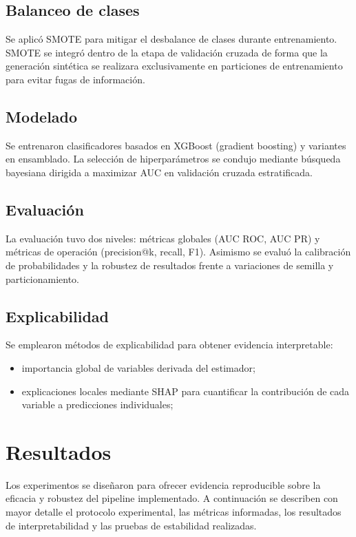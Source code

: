 \documentclass[12pt,a4paper]{article}
\begin{document}
\subsection{Balanceo de clases}
Se aplic\'o SMOTE para mitigar el desbalance de clases durante entrenamiento. SMOTE se integr\'o dentro de la etapa de validaci\'on cruzada de forma que la generaci\'on sint\'etica se realizara exclusivamente en particiones de entrenamiento para evitar fugas de informaci\'on.

\subsection{Modelado}
Se entrenaron clasificadores basados en XGBoost (gradient boosting) y variantes en ensamblado. La selecci\'on de hiperpar\'ametros se condujo mediante b\'usqueda bayesiana dirigida a maximizar AUC en validaci\'on cruzada estratificada.

\subsection{Evaluaci\'on}
La evaluaci\'on tuvo dos niveles: m\'etricas globales (AUC ROC, AUC PR) y m\'etricas de operaci\'on (precision@k, recall, F1). Asimismo se evalu\'o la calibraci\'on de probabilidades y la robustez de resultados frente a variaciones de semilla y particionamiento.

\subsection{Explicabilidad}
Se emplearon m\'etodos de explicabilidad para obtener evidencia interpretable:
\begin{itemize}[leftmargin=*]
  \item importancia global de variables derivada del estimador;
  \item explicaciones locales mediante SHAP para cuantificar la contribuci\'on de cada variable a predicciones individuales;
\end{itemize}

\section{Resultados}
Los experimentos se dise\~naron para ofrecer evidencia reproducible sobre la eficacia y robustez del pipeline implementado. A continuaci\'on se describen con mayor detalle el protocolo experimental, las m\'etricas informadas, los resultados de interpretabilidad y las pruebas de estabilidad realizadas.
\end{document}
